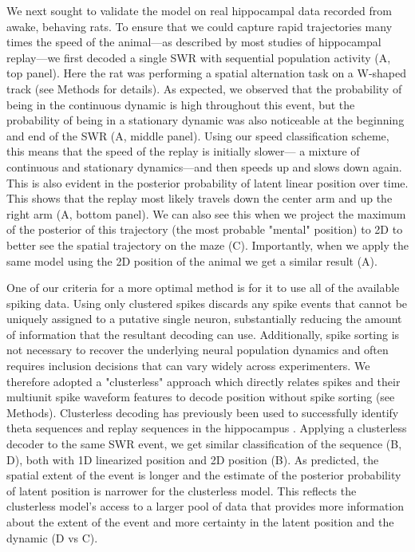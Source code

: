 \documentclass[9pt,lineno]{elife}
\begin{document}
We next sought to validate the model on real hippocampal data recorded from awake, behaving rats. To ensure that we could capture rapid trajectories many times the speed of the animal---as described by most studies of hippocampal replay---we first decoded a single SWR with sequential population activity (A, top panel). Here the rat was performing a spatial alternation task on a W-shaped track (see Methods for details). As expected, we observed that the probability of being in the continuous dynamic is high throughout this event, but the probability of being in a stationary dynamic was also noticeable at the beginning and end of the SWR (A, middle panel). Using our speed classification scheme, this means that the speed of the replay is initially slower--- a mixture of continuous and stationary dynamics---and then speeds up and slows down again. This is also evident in the posterior probability of latent linear position over time. This shows that the replay most likely travels down the center arm and up the right arm (A, bottom panel). We can also see this when we project the maximum of the posterior of this trajectory (the most probable "mental" position) to 2D to better see the spatial trajectory on the maze (C). Importantly, when we apply the same model using the 2D position of the animal we get a similar result (A).

One of our criteria for a more optimal method is for it to use all of the available spiking data. Using only clustered spikes discards any spike events that cannot be uniquely assigned to a putative single neuron, substantially reducing the amount of information that the resultant decoding can use. Additionally, spike sorting is not necessary to recover the underlying neural population dynamics \citep{TrautmannAccurateEstimationNeural2019} and often requires inclusion decisions that can vary widely across experimenters. We therefore adopted a "clusterless" approach which directly relates spikes and their multiunit spike waveform features to decode position without spike sorting (see Methods). Clusterless decoding has previously been used to successfully identify theta sequences and replay sequences in the hippocampus \citep{KloostermanBayesiandecodingusing2014, ChenTransductiveneuraldecoding2012,DengRapidclassificationhippocampal2016, KayConstantSubsecondCycling2020}. Applying a clusterless decoder to the same SWR event, we get similar classification of the sequence (B, D), both with 1D linearized position and 2D position (B). As predicted, the spatial extent of the event is longer and the estimate of the posterior probability of latent position is narrower for the clusterless model. This reflects the clusterless model's access to a larger pool of data that provides more information about the extent of the event and more certainty in the latent position and the dynamic (D vs C).
\end{document}
